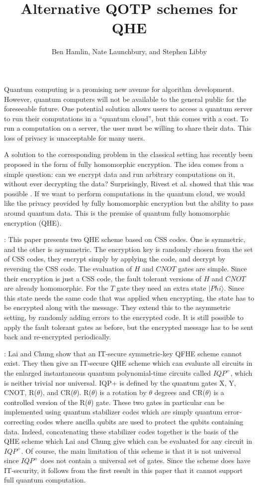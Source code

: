 \documentclass{article}
\title{Alternative QOTP schemes for QHE}
\author{Ben Hamlin, Nate Launchbury, and Stephen Libby}
\date{}
\newcommand{\ket}[1]{| #1 \rangle}
\begin{document}
\maketitle

Quantum computing is a promising new avenue for algorithm development.  However,
quantum computers will not be available to the general public for the
foreseeable future.  One potential solution allows users to access a quantum
server to run their computations in a “quantum cloud”, but this comes with a
cost.  To run a computation on a server, the user must be willing to share their
data.  This loss of privacy is unacceptable for many users.

A solution to the corresponding problem in the classical setting has recently
been proposed in the form of fully homomorphic encryption.  The idea comes from
a simple question: can we encrypt data and run arbitrary computations on it,
without ever decrypting the data?  Surprisingly, Rivest et al. showed that this
was possible \cite{rivest}.  If we want to perform computations in the quantum
cloud, we would like the privacy provided by fully homomorphic encryption but
the ability to pass around quantum data. This is the premise of quantum fully
homomorphic encryption (QHE).

\citet{liang2015}: This paper presents two QHE scheme based on CSS codes. One is
symmetric, and the other is asymmetric. The encryption key is randomly chosen
from the set of CSS codes, they encrypt simply by applying the code, and decrypt
by reversing the CSS code. The evaluation of $H$ and $CNOT$ gates are simple.
Since their encryption is just a CSS code, the fault tolerant versions of $H$
and $CNOT$ are already homomorphic. For the $T$ gate they need an extra state
$\ket{Phi}$. Since this state needs the same code that was applied when
encrypting, the state has to be encrypted along with the message. They extend
this to the asymmetric setting, by randomly adding errors to the encrypted code.
It is still possible to apply the fault tolerant gates as before, but the
encrypted message has to be sent back and re-encrypted periodically.

\citet{lai2017}: Lai and Chung show that an IT-secure symmetric-key QFHE scheme
cannot exist. They then give an IT-secure QHE scheme which can evaluate all
circuits in the enlarged instantaneous quantum polynomial-time circuits called
$IQP^+$, which is neither trivial nor universal. IQP+ is defined by the quantum
gates X, Y, CNOT, R($\theta$), and CR($\theta$). R($\theta$) is a rotation by
$\theta$ degrees and CR($\theta$) is a controlled version of the R($\theta$)
gate. These two gates in particular can be implemented using quantum stabilizer
codes which are simply quantum error-correcting codes where ancilla qubits are
used to protect the qubits containing data. Indeed, concatenating these
stabilizer codes together is the basis of the QHE scheme which Lai and Chung
give which can be evaluated for any circuit in $IQP^+$. Of course, the main
limitation of this scheme is that it is not universal since $IQP^+$ does not
contain a universal set of gates. Since the scheme does have IT-security, it
follows from the first result in this paper that it cannot support full quantum
computation.
\end{document}

